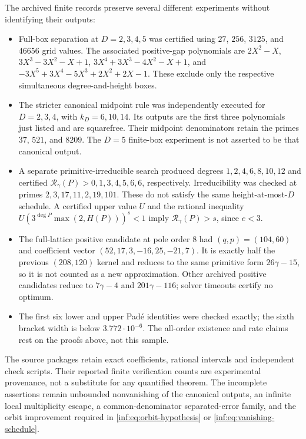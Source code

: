 \documentclass[11pt,a4paper]{article}
\theoremstyle{definition}
\theoremstyle{remark}
\numberwithin{equation}{section}
\begin{document}
The archived finite records preserve several different experiments without identifying their outputs:
\begin{itemize}
 \item Full-box separation at $D=2,3,4,5$ was certified using $27$, $256$, $3125$, and $46656$ grid values. The associated positive-gap polynomials are $2X^2-X$, $3X^3-3X^2-X+1$, $3X^4+3X^3-4X^2-X+1$, and $-3X^5+3X^4-5X^3+2X^2+2X-1$. These exclude only the respective simultaneous degree-and-height boxes.
 \item The stricter canonical midpoint rule was independently executed for $D=2,3,4$, with $k_D=6,10,14$. Its outputs are the first three polynomials just listed and are squarefree. Their midpoint denominators retain the primes $37$, $521$, and $8209$. The $D=5$ finite-box experiment is not asserted to be that canonical output.
 \item A separate primitive-irreducible search produced degrees $1,2,4,6,8,10,12$ and certified $\mathcal R_\gamma(P)>0,1,3,4,5,6,6$, respectively. Irreducibility was checked at primes $2,3,17,11,2,19,101$. These do not satisfy the same height-at-most-$D$ schedule. A certified upper value $U$ and the rational inequality $U(3^{\deg P}\max(2,H(P)))^s<1$ imply $\mathcal R_\gamma(P)>s$, since $e<3$.
 \item The full-lattice positive candidate at pole order $8$ had $(q,p)=(104,60)$ and coefficient vector $(52,17,3,-16,25,-21,7)$. It is exactly half the previous $(208,120)$ kernel and reduces to the same primitive form $26\gamma-15$, so it is not counted as a new approximation. Other archived positive candidates reduce to $7\gamma-4$ and $201\gamma-116$; solver timeouts certify no optimum.
 \item The first six lower and upper Pad\'e identities were checked exactly; the sixth bracket width is below $3.772\cdot10^{-6}$. The all-order existence and rate claims rest on the proofs above, not this sample.
\end{itemize}
The source packages retain exact coefficients, rational intervals and independent check scripts. Their reported finite verification counts are experimental provenance, not a substitute for any quantified theorem. The incomplete assertions remain unbounded nonvanishing of the canonical outputs, an infinite local multiplicity escape, a common-denominator separated-error family, and the orbit improvement required in \eqref{inf:eq:orbit-hypothesis} or \eqref{inf:eq:vanishing-schedule}.

\end{document}
